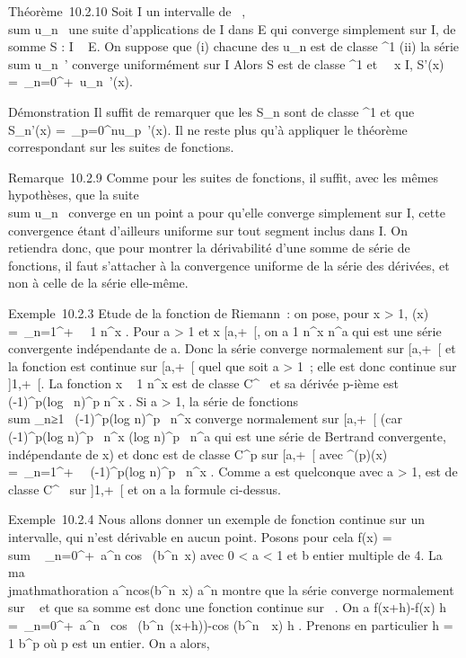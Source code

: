 \documentclass[]{article}
\begin{document}
Théorème~10.2.10 Soit I un intervalle de ~,
\\sum  u_n~ une
suite d'applications de I dans E qui converge simplement sur I, de somme
S : I \rightarrow~ E. On suppose que (i) chacune des u_n est de classe
^1 (ii) la série
\\sum  u_n~'
converge uniformément sur I Alors S est de classe ^1 et
\forall~~x \in I, S'(x) =\
\sum  _n=0^+\infty~u_n~'(x).

Démonstration Il suffit de remarquer que les S_n sont de classe
^1 et que S_n'(x) =\
\sum  _p=0^nu_p~'(x). Il
ne reste plus qu'à appliquer le théorème correspondant sur les suites de
fonctions.

Remarque~10.2.9 Comme pour les suites de fonctions, il suffit, avec les
mêmes hypothèses, que la suite
\\sum  u_n~
converge en un point a pour qu'elle converge simplement sur I, cette
convergence étant d'ailleurs uniforme sur tout segment inclus dans I. On
retiendra donc, que pour montrer la dérivabilité d'une somme de série de
fonctions, il faut s'attacher à la convergence uniforme de la série des
dérivées, et non à celle de la série elle-même.

Exemple~10.2.3 Etude de la fonction \zeta de Riemann~: on pose, pour x
\textgreater{} 1, \zeta(x) =\
\sum  _n=1^+\infty~~ 1
\over n^x . Pour a \textgreater{} 1 et x \in
{[}a,+\infty~{[}, on a  1 \over n^x 
\over n^a qui est une série convergente
indépendante de a. Donc la série converge normalement sur {[}a,+\infty~{[} et
la fonction \zeta est continue sur {[}a,+\infty~{[} quel que soit a \textgreater{}
1~; elle est donc continue sur {]}1,+\infty~{[}. La fonction x \rightarrow~ 1
\over n^x est de classe C^\infty~ et sa
dérivée p-ième est  (-1)^p(log~
n)^p \over n^x . Si a
\textgreater{} 1, la série de fonctions
\\sum  _n≥1~
(-1)^p(log n)^p~
\over n^x converge normalement sur
{[}a,+\infty~{[} (car \left 
(-1)^p(log n)^p~
\over n^x \right
\leq (log n)^p~
\over n^a qui est une série de Bertrand
convergente, indépendante de x) et donc \zeta est de classe C^p
sur {[}a,+\infty~{[} avec \zeta^(p)(x) =\
\sum  _n=1^+\infty~~
(-1)^p(log n)^p~
\over n^x . Comme a est quelconque avec a
\textgreater{} 1, \zeta est de classe C^\infty~ sur {]}1,+\infty~{[} et on a
la formule ci-dessus.

Exemple~10.2.4 Nous allons donner un exemple de fonction continue sur un
intervalle, qui n'est dérivable en aucun point. Posons pour cela f(x)
= \\sum ~
_n=0^+\infty~a^n cos~
(b^n\pi~x) avec 0 \textless{} a \textless{} 1 et b entier
multiple de 4. La ma\\jmathmathoration \left
a^ncos(b^n\pi~x)\right
 \leq a^n montre que la série converge normalement sur
~ et que sa somme est donc une fonction continue sur \mathbb{R}~. On a 
f(x+h)-f(x) \over h =\
\sum  _n=0^+\infty~a^n~
cos~
(b^n\pi~(x+h))-cos (b^n~\pi~x)
\over h . Prenons en particulier h = 1
\over b^p où p est un entier. On a alors,
\end{document}
